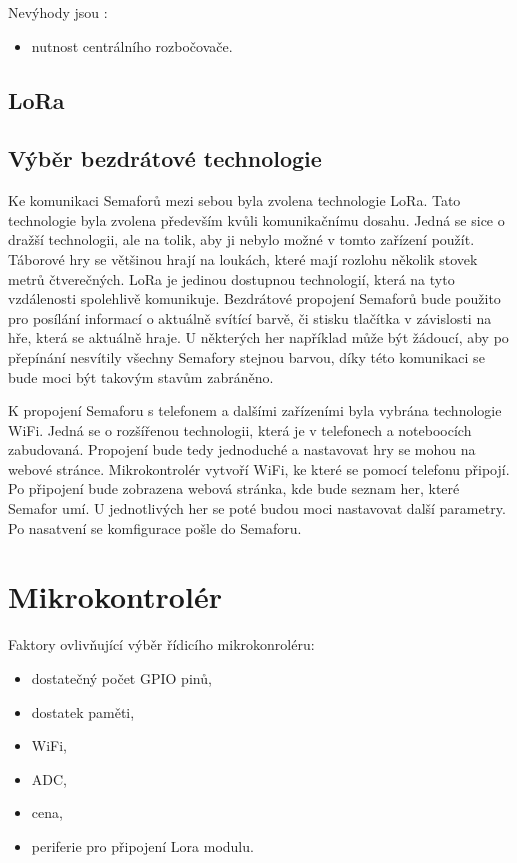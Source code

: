 Nevýhody jsou \cite{ZigBee_smart}:
\begin{itemize}
  \item nutnost centrálního rozbočovače.
\end{itemize}

\subsection{LoRa}



\subsection{Výběr bezdrátové technologie}
Ke komunikaci Semaforů mezi sebou byla zvolena technologie LoRa. Tato technologie byla zvolena především kvůli komunikačnímu dosahu. Jedná se sice o dražší technologii, 
ale na tolik, aby ji nebylo možné v tomto zařízení použít. Táborové hry se většinou hrají na loukách, které mají rozlohu několik stovek metrů čtverečných. LoRa je jedinou
dostupnou technologií, která na tyto vzdálenosti spolehlivě komunikuje. Bezdrátové propojení Semaforů bude použito pro posílání informací o aktuálně svítící barvě, či 
stisku tlačítka v závislosti na hře, která se aktuálně hraje. U některých her například může být žádoucí, aby po přepínání nesvítily všechny Semafory stejnou barvou,
díky této komunikaci se bude moci být takovým stavům zabráněno. 

K propojení Semaforu s telefonem a dalšími zařízeními byla vybrána technologie WiFi. Jedná se o rozšířenou technologii, která je v telefonech a noteboocích zabudovaná. 
Propojení bude tedy jednoduché a nastavovat hry se mohou na webové stránce. Mikrokontrolér vytvoří WiFi, ke které se pomocí telefonu připojí. Po připojení bude zobrazena
webová stránka, kde bude seznam her, které Semafor umí. U jednotlivých her se poté budou moci nastavovat další parametry. Po nasatvení se komfigurace pošle do Semaforu. 

\section{Mikrokontrolér}
Faktory ovlivňující výběr řídicího mikrokonroléru:
\begin{itemize}
  \item dostatečný počet GPIO pinů,
  \item dostatek paměti,
  \item WiFi,
  \item ADC,
  \item cena,
  \item periferie pro připojení Lora modulu.
\end{itemize}


